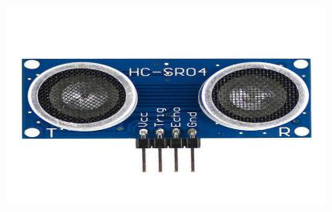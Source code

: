 \documentclass[
	11pt, %
	t, %
	aspectratio=169, %
]{beamer}
\begin{document}
\begin{frame}
\begin{center}
\begin{minipage}{0.30\textwidth}
			\includegraphics[width=\textwidth]{./resized_400x250/ultrasonic sensor.jpg}
		\end{minipage}
	

\end{center}
\end{frame}
\end{document}
